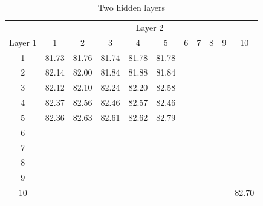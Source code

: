 \documentclass[12pt]{article}
\begin{document}
      \begin{table}[H]
        \centering
        \caption{Two hidden layers}
        \begin{tabular}{c|cccccccccc}
          \toprule
                & \multicolumn{10}{c}{Layer 2} \\
          Layer 1 & \multicolumn{1}{c}{1} & \multicolumn{1}{c}{2} & \multicolumn{1}{c}{3} & \multicolumn{1}{c}{4} & \multicolumn{1}{c}{5} & \multicolumn{1}{c}{6} & \multicolumn{1}{c}{7} & \multicolumn{1}{c}{8} & \multicolumn{1}{c}{9} & \multicolumn{1}{c}{10} \\
          \midrule
          1     & \multicolumn{1}{c}{81.73} & \multicolumn{1}{c}{81.76} & \multicolumn{1}{c}{81.74} & \multicolumn{1}{c}{81.78} & \multicolumn{1}{c}{81.78} &       &       &       &       &  \\
          2     & \multicolumn{1}{c}{82.14} & \multicolumn{1}{c}{82.00} & \multicolumn{1}{c}{81.84} & \multicolumn{1}{c}{81.88} & \multicolumn{1}{c}{81.84} &       &       &       &       &  \\
          3     & \multicolumn{1}{c}{82.12} & \multicolumn{1}{c}{82.10} & \multicolumn{1}{c}{82.24} & \multicolumn{1}{c}{82.20} & \multicolumn{1}{c}{82.58} &       &       &       &       &  \\
          4     & \multicolumn{1}{c}{82.37} & \multicolumn{1}{c}{82.56} & \multicolumn{1}{c}{82.46} & \multicolumn{1}{c}{82.57} & \multicolumn{1}{c}{82.46} &       &       &       &       &  \\
          5     & \multicolumn{1}{c}{82.36} & \multicolumn{1}{c}{82.63} & \multicolumn{1}{c}{82.61} & \multicolumn{1}{c}{82.62} & \multicolumn{1}{c}{82.79} &       &       &       &       &  \\
          6     &       &       &       &       &       &       &       &       &       &  \\
          7     &       &       &       &       &       &       &       &       &       &  \\
          8     &       &       &       &       &       &       &       &       &       &  \\
          9     &       &       &       &       &       &       &       &       &       &  \\
          10    &       &       &       &       &       &       &       &       &       & 82.70 \\
          \bottomrule
        \end{tabular}
        \label{tab:ann-str-double}
      \end{table}
      \doublespacing
\end{document}
